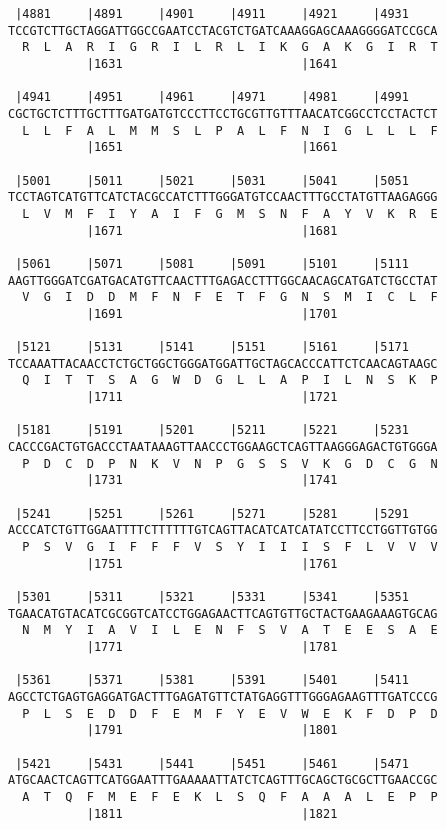 \documentclass{article}
\begin{document}
\begin{Verbatim}
 |4881     |4891     |4901     |4911     |4921     |4931    
TCCGTCTTGCTAGGATTGGCCGAATCCTACGTCTGATCAAAGGAGCAAAGGGGATCCGCA
  R  L  A  R  I  G  R  I  L  R  L  I  K  G  A  K  G  I  R  T
           |1631                         |1641              
  
 |4941     |4951     |4961     |4971     |4981     |4991    
CGCTGCTCTTTGCTTTGATGATGTCCCTTCCTGCGTTGTTTAACATCGGCCTCCTACTCT
  L  L  F  A  L  M  M  S  L  P  A  L  F  N  I  G  L  L  L  F
           |1651                         |1661              
  
 |5001     |5011     |5021     |5031     |5041     |5051    
TCCTAGTCATGTTCATCTACGCCATCTTTGGGATGTCCAACTTTGCCTATGTTAAGAGGG
  L  V  M  F  I  Y  A  I  F  G  M  S  N  F  A  Y  V  K  R  E
           |1671                         |1681              
  
 |5061     |5071     |5081     |5091     |5101     |5111    
AAGTTGGGATCGATGACATGTTCAACTTTGAGACCTTTGGCAACAGCATGATCTGCCTAT
  V  G  I  D  D  M  F  N  F  E  T  F  G  N  S  M  I  C  L  F
           |1691                         |1701              
  
 |5121     |5131     |5141     |5151     |5161     |5171    
TCCAAATTACAACCTCTGCTGGCTGGGATGGATTGCTAGCACCCATTCTCAACAGTAAGC
  Q  I  T  T  S  A  G  W  D  G  L  L  A  P  I  L  N  S  K  P
           |1711                         |1721              
  
 |5181     |5191     |5201     |5211     |5221     |5231    
CACCCGACTGTGACCCTAATAAAGTTAACCCTGGAAGCTCAGTTAAGGGAGACTGTGGGA
  P  D  C  D  P  N  K  V  N  P  G  S  S  V  K  G  D  C  G  N
           |1731                         |1741              
  
 |5241     |5251     |5261     |5271     |5281     |5291    
ACCCATCTGTTGGAATTTTCTTTTTTGTCAGTTACATCATCATATCCTTCCTGGTTGTGG
  P  S  V  G  I  F  F  F  V  S  Y  I  I  I  S  F  L  V  V  V
           |1751                         |1761              
  
 |5301     |5311     |5321     |5331     |5341     |5351    
TGAACATGTACATCGCGGTCATCCTGGAGAACTTCAGTGTTGCTACTGAAGAAAGTGCAG
  N  M  Y  I  A  V  I  L  E  N  F  S  V  A  T  E  E  S  A  E
           |1771                         |1781              
  
 |5361     |5371     |5381     |5391     |5401     |5411    
AGCCTCTGAGTGAGGATGACTTTGAGATGTTCTATGAGGTTTGGGAGAAGTTTGATCCCG
  P  L  S  E  D  D  F  E  M  F  Y  E  V  W  E  K  F  D  P  D
           |1791                         |1801              
  
 |5421     |5431     |5441     |5451     |5461     |5471    
ATGCAACTCAGTTCATGGAATTTGAAAAATTATCTCAGTTTGCAGCTGCGCTTGAACCGC
  A  T  Q  F  M  E  F  E  K  L  S  Q  F  A  A  A  L  E  P  P
           |1811                         |1821              
  

\end{Verbatim}
\end{document}
